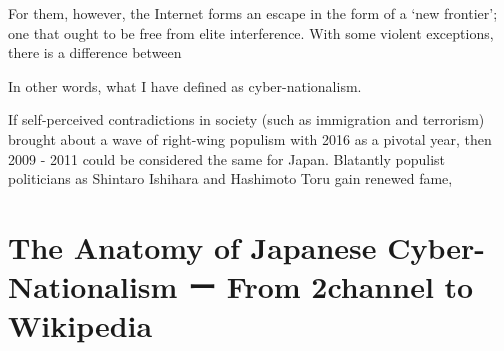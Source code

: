 \documentclass[10pt,british,A4paper,,openany]{memoir}
\begin{document}
For them, however, the Internet forms an escape in the form of a `new
frontier'; one that ought to be free from elite interference. With some
violent exceptions, there is a difference between

In other words, what I have defined as cyber-nationalism.

If self-perceived contradictions in society (such as immigration and
terrorism) brought about a wave of right-wing populism with 2016 as a
pivotal year, then 2009 - 2011 could be considered the same for Japan.
Blatantly populist politicians as Shintaro Ishihara and Hashimoto Toru
gain renewed fame,

\chapter{The Anatomy of Japanese Cyber-Nationalism ー From 2channel to
Wikipedia}\label{the-anatomy-of-japanese-cyber-nationalism-ux30fc-from-2channel-to-wikipedia}
\end{document}
